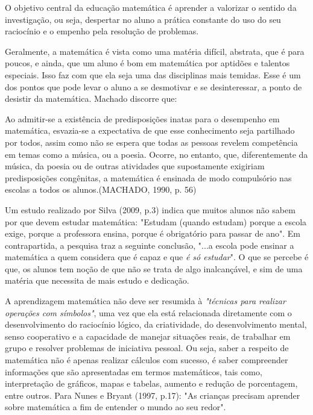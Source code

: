 \documentclass[brasil]{abnt}
\begin{document}
    O objetivo central da educação matemática é aprender a valorizar o sentido da investigação, ou seja, despertar no aluno a prática constante do uso do seu raciocínio e o empenho pela resolução de problemas.
     
    Geralmente, a matemática é vista como uma matéria difícil, abstrata, que é para poucos, e ainda, que um aluno é bom em matemática por aptidões e
    talentos especiais. Isso faz com que ela seja uma das disciplinas mais temidas. Esse é um dos pontos que pode levar o aluno a se desmotivar e se desinteressar, a ponto de desistir da matemática. 
    Machado discorre que:
    
		\begin{citacao}Ao admitir-se a existência de predisposições inatas para o desempenho em matemática, esvazia-se a expectativa de que esse conhecimento seja
					partilhado por todos, assim como não se espera que todas as pessoas revelem competência em temas como a música, ou a poesia. Ocorre, no entanto,
					que, diferentemente da música, da poesia ou de outras atividades que supostamente exigiriam predisposições congênitas, a matemática é ensinada de modo
					compulsório nas escolas a todos os alunos.(MACHADO, 1990, p. 56)
		\end{citacao}
		 
    Um estudo realizado por Silva (2009, p.3) indica que muitos alunos não sabem por que devem estudar matemática: "Estudam (quando estudam) porque a escola exige, porque a professora ensina, porque é 
    obrigatório para passar de ano". Em contrapartida, a pesquisa traz a seguinte conclusão, "...a escola pode ensinar a matemática a quem considera que é capaz e que \textit{é só estudar}". O que se percebe 
    é que, os alunos tem noção de que não se trata de algo inalcançável, e sim de uma matéria que necessita de mais estudo e dedicação.
	
	A aprendizagem matemática não deve ser resumida à \textit{"técnicas para realizar operações com símbolos"}, uma vez que ela está relacionada diretamente com o desenvolvimento do raciocínio lógico, da criatividade, do desenvolvimento mental, senso cooperativo e a capacidade de manejar situações reais, de trabalhar em grupo e resolver problemas de iniciativa pessoal. 
	Ou seja, saber a respeito de matemática não é apenas realizar cálculos com sucesso, é saber compreender informações que são apresentadas em termos matemáticos, tais como, interpretação de gráficos, 
	mapas e tabelas, aumento e redução de porcentagem, entre outros. Para Nunes e Bryant (1997, p.17): "As crianças precisam aprender sobre matemática a fim de entender o mundo ao seu redor".
			
\end{document}
